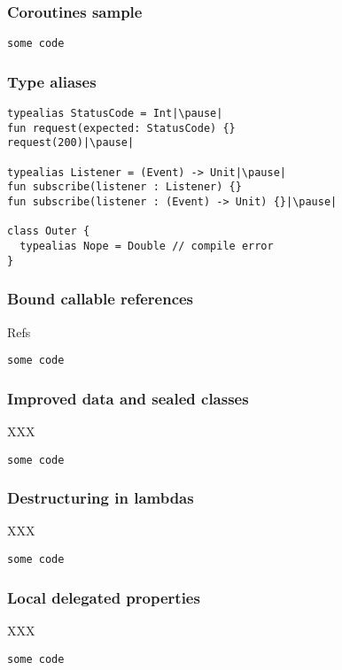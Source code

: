 \begin{frame}[fragile] \frametitle{Coroutines sample}
\begin{lstlisting}
some code
\end{lstlisting}
\end{frame}


\begin{frame}[fragile] \frametitle{Type aliases}
\begin{lstlisting}
typealias StatusCode = Int|\pause|
fun request(expected: StatusCode) {}
request(200)|\pause|

typealias Listener = (Event) -> Unit|\pause|
fun subscribe(listener : Listener) {}
fun subscribe(listener : (Event) -> Unit) {}|\pause|

class Outer {
  typealias Nope = Double // compile error
}
\end{lstlisting}
\end{frame}


\begin{frame}[fragile] \frametitle{Bound callable references}
Refs
\begin{lstlisting}
some code
\end{lstlisting}
\end{frame}


\begin{frame}[fragile] \frametitle{Improved data and sealed classes}
XXX
\begin{lstlisting}
some code
\end{lstlisting}
\end{frame}


\begin{frame}[fragile] \frametitle{Destructuring in lambdas}
XXX
\begin{lstlisting}
some code
\end{lstlisting}
\end{frame}


\begin{frame}[fragile] \frametitle{Local delegated properties}
XXX
\begin{lstlisting}
some code
\end{lstlisting}
\end{frame}

